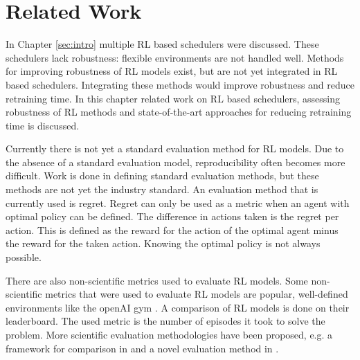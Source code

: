 \chapter{Related Work}

In Chapter \ref{sec:intro} multiple RL based schedulers were discussed. These
schedulers lack robustness: flexible environments are not handled well.
Methods for improving robustness of RL models exist, but are not yet
integrated in RL based schedulers. Integrating these methods would improve
robustness and reduce retraining time. In this chapter related work on RL
based schedulers, assessing robustness of RL methods and state-of-the-art
approaches for reducing retraining time is discussed.




Currently there is not yet a standard evaluation method for RL models. Due to
the absence of a standard evaluation model, reproducibility often becomes more
difficult. Work is done in defining standard evaluation methods, but these
methods are not yet the industry standard. An evaluation method that is
currently used is regret. Regret can only be used as a metric when an agent
with optimal policy can be defined. The difference in actions taken is the
regret per action. This is defined as the reward for the action of the optimal
agent minus the reward for the taken action. Knowing the optimal policy is not
always possible.

There are also non-scientific metrics used to evaluate RL models. Some
non-scientific metrics that were used to evaluate RL models are popular,
well-defined environments like the openAI gym \cite{gym2016}. A comparison of
RL models is done on their
leaderboard. The used metric
is the number of episodes it took to solve the problem. More scientific
evaluation methodologies have been proposed, e.g. a framework for comparison
in  and a novel evaluation method in .



